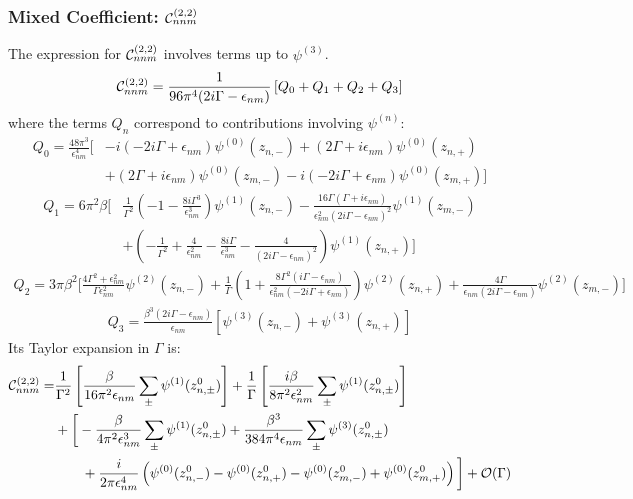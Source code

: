 \documentclass[twocolumn, prx, reprint, amsfonts, amsmath, amssymb, longbibliography, floatfix, aps]{revtex4-2}
\begin{document}
\subsubsection{Mixed Coefficient: \texorpdfstring{${\cal C}_{nnm}^{(2, 2)}$}{Cnnm}}
The expression for ${\cal C}_{nnm}^{(2, 2)}$ involves terms up to $\psi^{(3)}$.
\begin{align}
{\cal C}_{nnm}^{(2, 2)} = \frac{1}{96 \pi^4 (2 i \Gamma - \epsilon_{nm})} \left[ Q_0 + Q_1 + Q_2 + Q_3 \right]
\end{align}
where the terms $Q_n$ correspond to contributions involving $\psi^{(n)}$:
\begin{align}
Q_0 = \frac{48 \pi^3}{\epsilon_{nm}^4}  \Bigg[
& -i (-2 i \Gamma + \epsilon_{nm}) \psi^{(0)}(z_{n,-})
+ (2 \Gamma + i \epsilon_{nm}) \psi^{(0)}(z_{n,+}) \nonumber \\
& + (2 \Gamma + i \epsilon_{nm}) \psi^{(0)}(z_{m,-})
- i (-2 i \Gamma + \epsilon_{nm}) \psi^{(0)}(z_{m,+})
\Bigg]
\end{align}
\begin{align}
Q_1 = 6 \pi^2 \beta \Bigg[
& \frac{1}{\Gamma^2} \left(-1 - \frac{8 i \Gamma^3}{\epsilon_{nm}^3}\right) \psi^{(1)}(z_{n,-}) - \frac{16 \Gamma (\Gamma + i \epsilon_{nm})}{\epsilon_{nm}^2 (2 i \Gamma - \epsilon_{nm})^2} \psi^{(1)}(z_{m,-})
\nonumber \\
& + \left(-\frac{1}{\Gamma^2} + \frac{4}{\epsilon_{nm}^2} - \frac{8 i \Gamma}{\epsilon_{nm}^3} - \frac{4}{(2 i \Gamma - \epsilon_{nm})^2}\right) \psi^{(1)}(z_{n,+}) 
\Bigg]
\end{align}
\begin{align}
Q_2 = 3 \pi \beta^2 \Bigg[
\frac{4 \Gamma^2 + \epsilon_{nm}^2}{\Gamma \epsilon_{nm}^2} \psi^{(2)}(z_{n,-}) + \frac{1}{\Gamma} \left(1 + \frac{8 \Gamma^2 (i \Gamma - \epsilon_{nm})}{\epsilon_{nm}^2 (-2 i \Gamma + \epsilon_{nm})}\right) \psi^{(2)}(z_{n,+}) + \frac{4 \Gamma}{\epsilon_{nm} (2 i \Gamma - \epsilon_{nm})} \psi^{(2)}(z_{m,-})
\Bigg]
\end{align}
\begin{align}
Q_3 = \frac{\beta^3 (2 i \Gamma - \epsilon_{nm})}{\epsilon_{nm}} \left[ \psi^{(3)}(z_{n,-}) + \psi^{(3)}(z_{n,+}) \right]
\end{align}
Its Taylor expansion in $\Gamma$ is:
\begin{align}
{\cal C}_{nnm}^{(2, 2)} = & \frac{1}{\Gamma^2} \left[ \frac{\beta}{16\pi^2\epsilon_{nm}} \sum_{\pm} \psi^{(1)}(z_{n,\pm}^0) \right] + \frac{1}{\Gamma} \left[ \frac{i\beta}{8\pi^2\epsilon_{nm}^2} \sum_{\pm} \psi^{(1)}(z_{n,\pm}^0) \right] \nonumber \\
& +  \bigg[ -\frac{\beta}{4\pi^2\epsilon_{nm}^3} \sum_{\pm} \psi^{(1)}(z_{n,\pm}^0) + \frac{\beta^3}{384\pi^4\epsilon_{nm}} \sum_{\pm} \psi^{(3)}(z_{n,\pm}^0) \nonumber \\
& \qquad + \frac{i}{2\pi\epsilon_{nm}^4} \left( \psi^{(0)}(z_{n,-}^0) - \psi^{(0)}(z_{n,+}^0) - \psi^{(0)}(z_{m,-}^0) + \psi^{(0)}(z_{m,+}^0) \right) \bigg] + {\cal O}(\Gamma)
\end{align}
\end{document}
